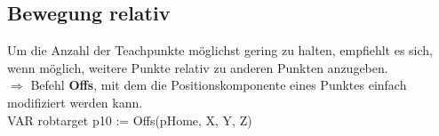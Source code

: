 \subsection{Bewegung relativ}
Um die Anzahl der Teachpunkte möglichst gering zu halten, empfiehlt es sich, wenn möglich, weitere Punkte relativ zu anderen Punkten anzugeben. \\
$\Rightarrow$ Befehl \textbf{Offs}, mit dem die Positionskomponente eines Punktes einfach modifiziert werden kann.\\
VAR robtarget p10 := Offs(pHome, X, Y, Z)




















































































